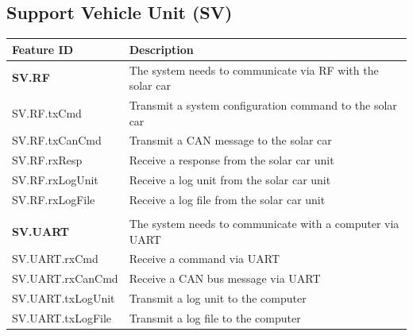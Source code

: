 \documentclass[]{article}
\begin{document}
\subsection{Support Vehicle Unit (SV)}
\begin{table}[H]
    \centering
    \begin{tabular}{|l|l|}
    \hline
        \textbf{Feature ID} & \textbf{Description} \\ \hline
        \textbf{SV.RF} & The system needs to communicate via RF with the solar car \\ \hline
        SV.RF.txCmd & Transmit a system configuration command to the solar car \\ \hline
        SV.RF.txCanCmd & Transmit a CAN message to the solar car \\ \hline
        SV.RF.rxResp & Receive a response from the solar car unit \\ \hline
        SV.RF.rxLogUnit & Receive a log unit from the solar car unit \\ \hline
        SV.RF.rxLogFile & Receive a log file from the solar car unit \\ \hline
         &  \\ \hline
        \textbf{SV.UART} & The system needs to communicate with a computer via UART \\ \hline
        SV.UART.rxCmd & Receive a command via UART \\ \hline
        SV.UART.rxCanCmd & Receive a CAN bus message via UART \\ \hline
        SV.UART.txLogUnit & Transmit a log unit to the computer \\ \hline
        SV.UART.txLogFile & Transmit a log file to the computer \\ \hline
    \end{tabular}
\end{table}
\end{document}

